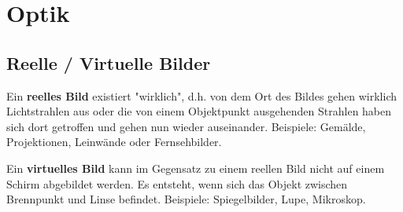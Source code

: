 \section{Optik}

\subsection{Reelle / Virtuelle Bilder}

Ein \textbf{reelles Bild} existiert "wirklich", d.h. von dem Ort des Bildes
gehen wirklich Lichtstrahlen aus oder die von einem Objektpunkt ausgehenden
Strahlen haben sich dort getroffen und gehen nun wieder auseinander. Beispiele:
Gemälde, Projektionen, Leinwände oder Fernsehbilder.

Ein \textbf{virtuelles Bild} kann im Gegensatz zu einem reellen Bild nicht auf
einem Schirm abgebildet werden. Es entsteht, wenn sich das Objekt zwischen
Brennpunkt und Linse befindet. Beispiele: Spiegelbilder, Lupe, Mikroskop.

